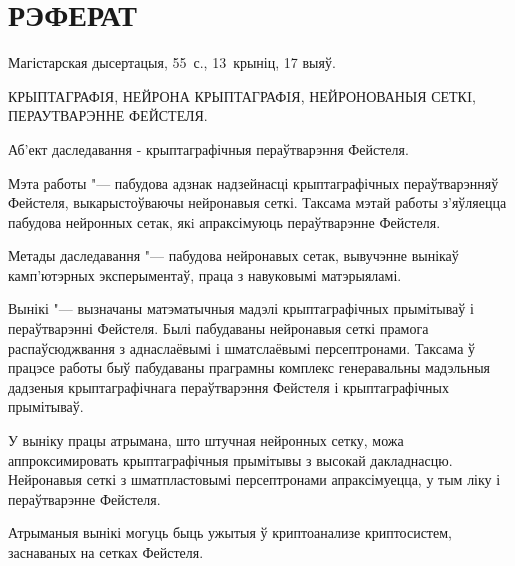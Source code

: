 \chapter*{РЭФЕРАТ}

Магістарская дысертацыя, 55 с., 13 крыніц, 17 выяў.

КРЫПТАГРАФIЯ, НЕЙРОНА КРЫПТАГРАФIЯ, НЕЙРОНОВАНЫЯ СЕТКI, ПЕРАУТВАРЭННЕ ФЕЙСТЕЛЯ.
\bigskip

Аб'ект даследавання - крыптаграфічныя пераўтварэння Фейстеля.
\bigskip

Мэта работы "--- пабудова адзнак надзейнасці крыптаграфічных пераўтварэнняў Фейстеля, выкарыстоўваючы нейронавыя сеткі.
Таксама мэтай работы з'яўляецца пабудова нейронных сетак, якi апраксімуюць пераўтварэнне Фейстеля.
\bigskip

Метады даследавання "--- пабудова нейронавых сетак, вывучэнне вынікаў камп'ютэрных эксперыментаў, праца з навуковымі матэрыяламі.
\bigskip

Вынікі "--- вызначаны матэматычныя мадэлі крыптаграфічных прымітываў і пераўтварэнні Фейстеля. Былі пабудаваны нейронавыя сеткі прамога распаўсюджвання з аднаслаёвымі і шматслаёвымі персептронами. Таксама ў працэсе работы быў пабудаваны праграмны комплекс генеравальны мадэльныя дадзеныя крыптаграфічнага пераўтварэння Фейстеля і крыптаграфічных прымітываў.
\bigskip

У выніку працы атрымана, што штучная нейронных сетку, можа аппроксимировать крыптаграфічныя прымітывы з высокай дакладнасцю.
Нейронавыя сеткі з шматпластовымі персептронами апраксімуецца, у тым ліку і пераўтварэнне Фейстеля.

\bigskip
Атрыманыя вынікі могуць быць ужытыя ў криптоанализе криптосистем, заснаваных на сетках Фейстеля.
